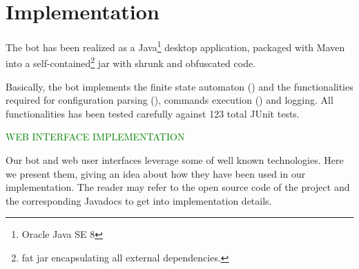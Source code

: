 \section{Implementation}
\label{sec:implementation}

The bot has been realized as a Java\footnote{Oracle Java SE 8} desktop application, packaged with Maven into a self-contained\footnote{fat jar encapsulating all external dependencies.} jar with shrunk and obfuscated code.

Basically, the bot implements the finite state automaton () and the functionalities required for configuration parsing (), commands execution () and logging. All functionalities has been tested carefully against 123 total JUnit tests.

\textcolor{green}{WEB INTERFACE IMPLEMENTATION \lipsum[1]}

Our bot and web user interfaces leverage some of well known technologies. Here we present them, giving an idea about how they have been used in our implementation. The reader may refer to the open source code of the project and the corresponding Javadocs to get into implementation details.

